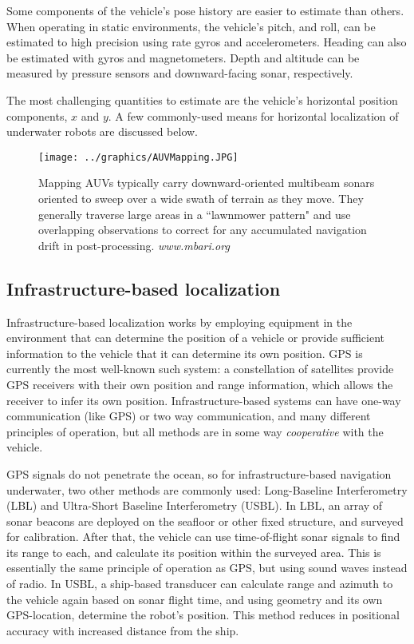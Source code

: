 Some components of the vehicle's pose history are easier to estimate than others. When operating in static environments, the vehicle's pitch, and roll, can be estimated to high precision using rate gyros and accelerometers. Heading can also be estimated with gyros and magnetometers. Depth and altitude can be measured by pressure sensors and downward-facing sonar, respectively. 

The most challenging quantities to estimate are the vehicle's horizontal position components, $x$ and $y$. A few commonly-used means for horizontal localization of underwater robots are discussed below.

\begin{figure}[!htb]
   \centering
   \texttt{[image: ../graphics/AUVMapping.JPG]} %
   \caption{Mapping AUVs typically carry downward-oriented multibeam sonars oriented to sweep over a wide swath of terrain as they move. They generally traverse large areas in a ``lawnmower pattern" and use overlapping observations to correct for any accumulated navigation drift in post-processing. \emph{www.mbari.org} }
   \label{fig:AUVbathyMapping}
\end{figure}

\subsection{Infrastructure-based localization}

Infrastructure-based localization works by employing equipment in the environment that can determine the position of a vehicle or provide sufficient information to the vehicle that it can determine its own position. GPS is currently the most well-known such system: a constellation of satellites provide GPS receivers with their own position and range information, which allows the receiver to infer its own position. Infrastructure-based systems can have one-way communication (like GPS) or two way communication, and many different principles of operation, but all methods are in some way \emph{cooperative} with the vehicle. 

GPS signals do not penetrate the ocean, so for infrastructure-based navigation underwater, two other methods are commonly used: Long-Baseline Interferometry (LBL) and Ultra-Short Baseline Interferometry (USBL). In LBL, an array of sonar beacons are deployed on the seafloor or other fixed structure, and surveyed for calibration. After that, the vehicle can use time-of-flight sonar signals to find its range to each, and calculate its position within the surveyed area. This is essentially the same principle of operation as GPS, but using sound waves instead of radio. In USBL, a ship-based transducer can calculate range and azimuth to the vehicle again based on sonar flight time, and using geometry and its own GPS-location, determine the robot's position. This method reduces in positional accuracy with increased distance from the ship. 

